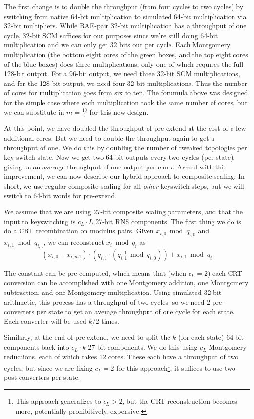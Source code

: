 \documentclass[../../fheimpl.tex]{subfiles}
\begin{document}
	The first change is to double the throughput (from four cycles to two cycles) by switching from native 64-bit multiplication to simulated 64-bit multiplication via 32-bit multipliers. While RAE-pair 32-bit multiplication has a throughput of one cycle, 32-bit SCM suffices for our purposes since we're still doing 64-bit multiplication and we can only get 32 bits out per cycle. Each Montgomery multiplication (the bottom eight cores of the green boxes, and the top eight cores of the blue boxes) does three multiplications, only one of which requires the full 128-bit output. For a 96-bit output, we need three 32-bit SCM multiplications, and for the 128-bit output, we need four 32-bit multiplications. Thus the number of cores for multiplication goes from six to ten. The forumula above was designed for the simple case where each multiplication took the same number of cores, but we can substitute in $m=\frac{10}{3}$ for this new design.
	
	At this point, we have doubled the throughput of pre-extend at the cost of a few additional cores. But we need to double the throughput again to get a throughput of one. We do this by doubling the number of tweaked topologies per key-switch state. Now we get two 64-bit outputs every two cycles (per state), giving us an average throughput of one output per clock. Armed with this improvement, we can now describe our hybrid approach to composite scaling. In short, we use regular composite scaling for all \emph{other} keyswitch steps, but we will switch to 64-bit words for pre-extend.
	
	We assume that we are using 27-bit composite scaling parameters, and that the input to keyswitching is $c_L\cdot L$ 27-bit RNS components. The first thing we do is do a CRT recombination on modulus pairs. Given $x_{i,0}\bmod q_{i,0}$ and $x_{i,1} \bmod q_{i,1}$, we can reconstruct $x_i\bmod q_i$ as
	\[(x_{i,0}-x_{i,m1})\cdot (q_{i,1}\cdot (q_{i,1}^{-1}\bmod q_{i,0})) + x_{i,1} \bmod q_i\]
	
	The constant can be pre-computed, which means that (when $c_L=2$) each CRT conversion can be accomplished with one Montgomery addition, one Montgomery subtraction, and one Montgomery multiplication. Using simulated 32-bit arithmetic, this process has a throughput of two cycles, so we need $2$ pre-converters per state to get an average throughput of one cycle for each state. Each converter will be used $k/2$ times.
	
	Similarly, at the end of pre-extend, we need to split the $k$ (for each state) 64-bit components back into $c_L\cdot k$ 27-bit components. We do this using $c_L$ Montgomery reductions, each of which takes 12 cores. These each have a throughput of two cycles, but since we are fixing $c_L=2$ for this approach\footnote{This approach generalizes to $c_L>2$, but the CRT reconstruction becomes more, potentially prohibitively, expensive.}, it suffices to use two post-converters per state.
	
\end{document}
